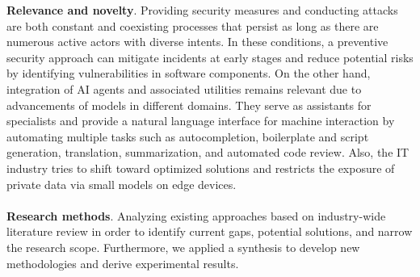 \begin{SingleSpace}
\begin{itemize}
\end{itemize}
\textbf{Relevance and novelty}. Providing security measures and conducting attacks are both constant and coexisting processes that persist as long as there are numerous active actors with diverse intents. In these conditions, a preventive security approach can mitigate incidents at early stages and reduce potential risks by identifying vulnerabilities in software components. On the other hand, integration of AI agents and associated utilities remains relevant due to advancements of models in different domains. They serve as assistants for specialists and provide a natural language interface for machine interaction by automating multiple tasks such as autocompletion, boilerplate and script generation, translation, summarization, and automated code review. Also, the IT industry tries to shift toward optimized solutions and restricts the exposure of private data via small models on edge devices.\\\\
\textbf{Research methods}. Analyzing existing approaches based on industry-wide literature review in order to identify current gaps, potential solutions, and narrow the research scope. Furthermore, we applied a synthesis to develop new methodologies and derive experimental results.

\end{SingleSpace}
